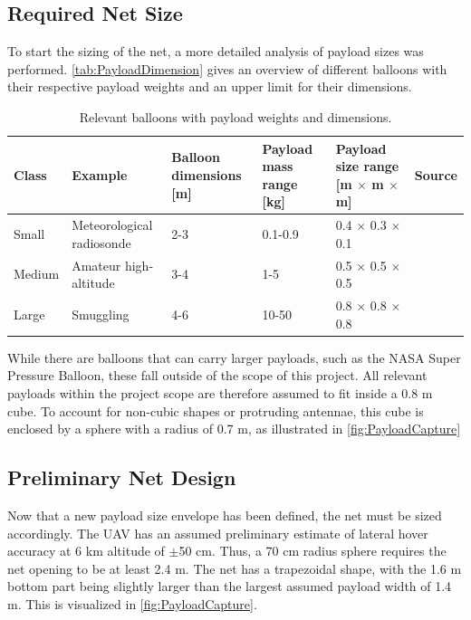 \subsection{Required Net Size}
To start the sizing of the net, a more detailed analysis of payload sizes was performed. \autoref{tab:PayloadDimension} gives an overview of different balloons with their respective payload weights and an upper limit for their dimensions.

\begin{table}[H]
\centering
\small
\caption{Relevant balloons with payload weights and dimensions.}
\label{tab:PayloadDimension}
\begin{tabularx}{\textwidth}{p{} p{} p{} p{} p{} X}
\toprule
\textbf{Class} & \textbf{Example} & \textbf{Balloon dimensions [m]} & \textbf{Payload mass range [kg]} & \textbf{Payload size range [m $\times$ m $\times$ m]} & \textbf{Source} \\
\midrule

Small & Meteorological radiosonde 
& 2-3 
& 0.1-0.9 
& 0.4 $\times$ 0.3 $\times$ 0.1 
& \\

Medium & Amateur high-altitude 
& 3-4 
& 1-5 
& 0.5 $\times$ 0.5 $\times$ 0.5 
& \\

Large & Smuggling 
& 4-6 
& 10-50 
& 0.8 $\times$ 0.8 $\times$ 0.8 
& \\

\bottomrule
\end{tabularx}
\end{table}

While there are balloons that can carry larger payloads, such as the NASA Super Pressure Balloon\cite{NASA2022Super-pressure-balloon-fact-sheet}, these fall outside of the scope of this project. All relevant payloads within the project scope are therefore assumed to fit inside a 0.8 m cube. To account for non-cubic shapes or protruding antennae, this cube is enclosed by a sphere with a radius of 0.7 m, as illustrated in \autoref{fig:PayloadCapture}

\subsection{Preliminary Net Design}
Now that a new payload size envelope has been defined, the net must be sized accordingly. The UAV has an assumed preliminary estimate of lateral hover accuracy at 6 km altitude of $\pm$50 cm. Thus, a 70 cm radius sphere requires the net opening to be at least 2.4 m. The net has a trapezoidal shape, with the 1.6 m bottom part being slightly larger than the largest assumed payload width of 1.4 m. This is visualized in \autoref{fig:PayloadCapture}.

